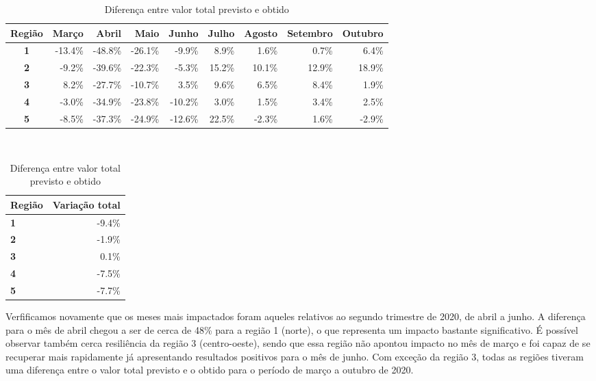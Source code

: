 \begin{table}[htb]
\centering
\caption{Diferença entre valores transacionados previstos e obtidos por região no período da pandemia}
\label{tab:pandemia:variacao-por-regiao}
\begin{subtable}[h]{\textwidth}
    \centering
    \begin{tabular}{c|r|r|r|r|r|r|r|r}
        \toprule
        \textbf{Região} & Março & Abril & Maio & Junho & Julho & Agosto & Setembro & Outubro \\
        \midrule
        \textbf{1} & -13.4\% & -48.8\% & -26.1\% &  -9.9\% &  8.9\% &  1.6\% &  0.7\% &  6.4\% \\
        \textbf{2} &  -9.2\% & -39.6\% & -22.3\% &  -5.3\% & 15.2\% & 10.1\% & 12.9\% & 18.9\% \\
        \textbf{3} &   8.2\% & -27.7\% & -10.7\% &   3.5\% &  9.6\% &  6.5\% &  8.4\% &  1.9\% \\
        \textbf{4} &  -3.0\% & -34.9\% & -23.8\% & -10.2\% &  3.0\% &  1.5\% &  3.4\% &  2.5\% \\
        \textbf{5} &  -8.5\% & -37.3\% & -24.9\% & -12.6\% & 22.5\% & -2.3\% &  1.6\% & -2.9\% \\
        \bottomrule
    \end{tabular}
    \caption{Diferença entre valor mensal previsto e obtido}
\end{subtable} ~ \\
\begin{subtable}[h]{0.45\textwidth}
    \centering
    \begin{tabular}{l|r}
        \toprule
        Região & Variação total \\
        \midrule
        \textbf{1} & -9.4\% \\
        \textbf{2} & -1.9\% \\
        \textbf{3} &  0.1\% \\
        \textbf{4} & -7.5\% \\
        \textbf{5} & -7.7\% \\
        \bottomrule
    \end{tabular}
    \caption{Diferença entre valor total previsto e obtido}
\end{subtable}
\fdadospesquisa
\end{table}

Verfificamos novamente que os meses mais impactados foram aqueles relativos ao segundo trimestre de 2020, de abril a junho. A diferença para o mês de abril chegou a ser de cerca de 48\% para a região 1 (norte), o que representa um impacto bastante significativo. É possível observar também cerca resiliência da região 3 (centro-oeste), sendo que essa região não apontou impacto no mês de março e foi capaz de se recuperar mais rapidamente já apresentando resultados positivos para o mês de junho. Com exceção da região 3, todas as regiões tiveram uma diferença entre o valor total previsto e o obtido para o período de março a outubro de 2020.

